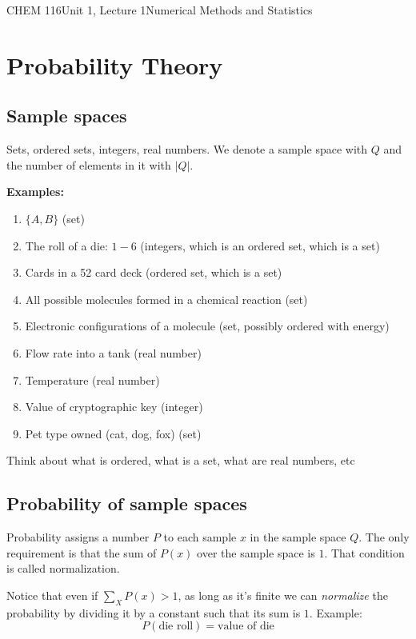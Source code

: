 \documentclass{article}
\begin{document}
\begin{tdoc}{CHEM 116}{Unit 1, Lecture 1}{Numerical Methods and Statistics}
\begin{enumerate}
\end{enumerate}

\section{Probability Theory}

\subsection{Sample spaces}

Sets, ordered sets, integers, real numbers. We denote a sample space
with $Q$ and the number of elements in it with $|Q|$.

{\bf Examples:}
\begin{enumerate}

\item $\{A, B\}$ (set)
\item The roll of a die: $1-6$ (integers, which is an ordered set, which is a set)
\item Cards in a 52 card deck (ordered set, which is a set)
\item All possible molecules formed in a chemical reaction (set)
\item Electronic configurations of a molecule (set, possibly ordered with energy)
\item Flow rate into a tank (real number)
\item Temperature (real number)
\item Value of cryptographic key (integer)
\item Pet type owned (cat, dog, fox) (set)

\end{enumerate}

Think about what is ordered, what is a set, what are real numbers, etc

\subsection{Probability of sample spaces}
Probability assigns a number $P$ to each sample $x$ in the sample
space $Q$. The only requirement is that the sum of $P(x)$ over the
sample space is $1$. That condition is called normalization.

Notice that even if $\sum_{X} P(x) > 1$, as long as it's finite we can
\emph{normalize} the probability by dividing it by a constant such
that its sum is $1$. Example: 
\begin{equation}
P(\textrm{die roll}) = \textrm{value of die}
\end{equation}


\end{tdoc}
\end{document}
